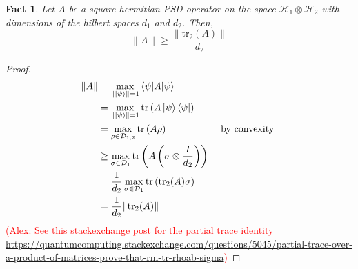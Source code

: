 \documentclass[12pt]{article}
\theoremstyle{plain}
\newtheorem{fact}[theorem]{Fact}
\newcommand{\AlexNote}[1]{\textcolor{red}{(Alex: #1)}}
\newcommand{\AlexNote}[1]{}
\begin{document}
\begin{fact}
    Let $A$ be a square hermitian PSD operator on the space $\mathcal{H}_1 \otimes \mathcal{H}_2$ with dimensions of the hilbert spaces $d_1$ and $d_2$. Then,
    \[\|A\| \geq \frac{\|\text{tr}_2(A)\|}{d_2}\]
\end{fact}
\begin{proof}
    \begin{align*}
        \|A\| &= \max_{\|\ket{\psi}\| = 1} \braket{\psi | A|\psi}\\
        &= \max_{\|\ket{\psi}\| = 1}\text{tr}\left(A \ket{\psi}\bra{\psi}\right)\\
        &= \max_{\rho \in \mathcal{D}_{1,2}} \text{tr}\left(A \rho\right) & \text{ by convexity }\\
        &\geq \max_{\sigma \in \mathcal{D}_{1}} \text{tr}\left(A \left(\sigma \otimes \frac{I}{d_2}\right)\right)\\
        &= \frac{1}{d_2} \max_{\sigma \in \mathcal{D}_{1}} \text{tr}\left(\text{tr}_2(A) \sigma \right)\\
        &= \frac{1}{d_2} \|\text{tr}_2(A)\|
    \end{align*}
\AlexNote{See this stackexchange post for the partial trace identity \url{https://quantumcomputing.stackexchange.com/questions/5045/partial-trace-over-a-product-of-matrices-prove-that-rm-tr-rhoab-sigma}}
\end{proof}
\end{document}
